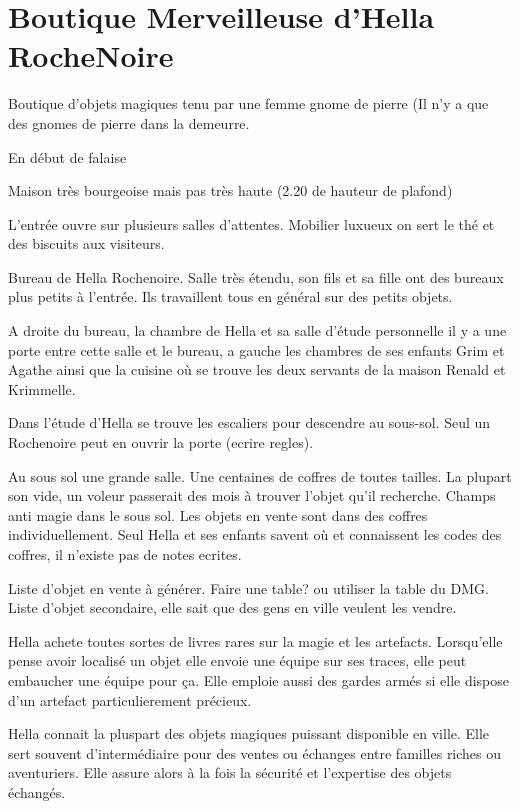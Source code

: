 \section{Boutique Merveilleuse d'Hella RocheNoire}

Boutique d'objets magiques tenu par une femme gnome de pierre
(Il n'y a que des gnomes de pierre dans la demeurre.

En début de falaise

Maison très bourgeoise mais pas très haute (2.20 de hauteur de plafond)

L'entrée ouvre sur plusieurs salles d'attentes. Mobilier luxueux on sert 
le thé et des biscuits aux visiteurs.

Bureau de Hella Rochenoire. Salle très étendu, son fils et sa fille ont
des bureaux plus petits à l'entrée. Ils travaillent tous en général sur 
des petits objets. 

A droite du bureau, la chambre de Hella et sa salle d'étude personnelle
il y a une porte entre cette salle et le bureau, a gauche les chambres
de ses enfants Grim et Agathe ainsi que la cuisine où se trouve les deux
servants de la maison Renald et Krimmelle.

Dans l'étude d'Hella se trouve les escaliers pour descendre au sous-sol.
Seul un Rochenoire peut en ouvrir la porte (ecrire regles).

Au sous sol une grande salle. Une centaines de coffres de toutes tailles.
La plupart son vide, un voleur passerait des mois à trouver l'objet 
qu'il recherche. Champs anti magie dans le sous sol. Les objets en vente 
sont dans des coffres individuellement. Seul Hella et ses enfants savent 
où et connaissent les codes des coffres, il n'existe pas de notes ecrites.

Liste d'objet en vente à générer. Faire une table? ou utiliser la table
du DMG. Liste d'objet secondaire, elle sait que des gens en ville veulent 
les vendre.

Hella achete toutes sortes de livres rares sur la magie et les artefacts.
Lorsqu'elle pense avoir localisé un objet elle envoie une équipe sur ses 
traces, elle peut embaucher une équipe pour ça. Elle emploie aussi des
gardes armés si elle dispose d'un artefact particulierement précieux.

Hella connait la pluspart des objets magiques puissant disponible en ville.
Elle sert souvent d'intermédiaire pour des ventes ou échanges entre familles
riches ou aventuriers. Elle assure alors à la fois la sécurité et 
l'expertise des objets échangés. 

